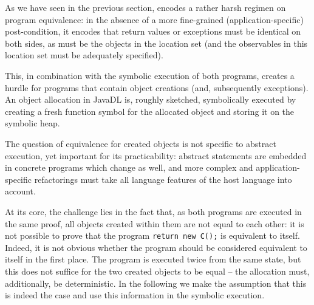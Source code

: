 
As we have seen in the previous section, \Refinity{} encodes a rather harsh regimen on program equivalence:
in the absence of a more fine-grained (application-specific) post-condition, it encodes that return values or exceptions must be identical on both sides,
as must be the objects in the \relevant{} location set (and the observables in this location set must be adequately specified).

This, in combination with the symbolic execution of both programs, creates a hurdle for programs that contain object creations (and, subsequently exceptions).
An object allocation in JavaDL is, roughly sketched, symbolically executed by creating a fresh function symbol for the allocated object and storing it on the symbolic heap.

The question of equivalence for created objects is not specific to abstract execution, yet important for its practicability: 
abstract statements are embedded in concrete programs which change as well, and more complex and application-specific refactorings must take all language features of the
host language into account.


At its core, the challenge lies in the fact that, as both programs are executed in the same proof, all objects created within them are not equal to each other: it is not possible to prove that the program \lstinline[style=refinity]|return new C();| is equivalent to itself.
Indeed, it is not obvious whether the program should be considered equivalent to itself in the first place.
The program is executed twice from the same state, but this does not suffice for the two created objects to be equal -- the allocation must, additionally, be deterministic.
In the following we make the assumption that this is indeed the case and use this information in the symbolic execution.



